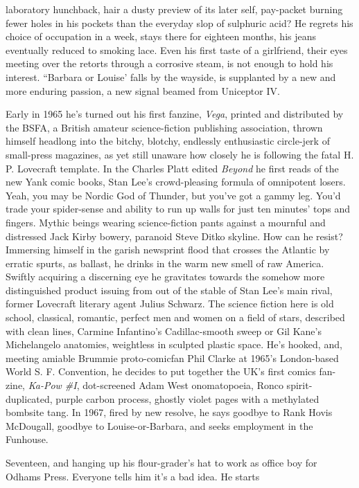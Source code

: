 \documentclass[
]{article}
\begin{document}
laboratory hunchback, hair a dusty preview of its later self, pay-packet
burning fewer holes in his pockets than the everyday slop of sulphuric
acid? He regrets his choice of occupation in a week, stays there for
eighteen months, his jeans eventually reduced to smoking lace. Even his
first taste of a girlfriend, their eyes meeting over the retorts through
a corrosive steam, is not enough to hold his interest. ``Barbara or
Louise' falls by the wayside, is supplanted by a new and more enduring
passion, a new signal beamed from Uniceptor IV. \par
Early in 1965 he's turned out his first fanzine, \emph{Vega},
printed and distributed by the BSFA, a British amateur science-fiction
publishing association, thrown himself headlong into the bitchy,
blotchy, endlessly enthusiastic circle-jerk of small-press magazines, as
yet still unaware how closely he is following the fatal H. P. Lovecraft
template. In the Charles Platt edited \emph{Beyond} he first reads of
the new Yank comic books, Stan Lee's crowd-pleasing formula of
omnipotent losers. Yeah, you may be Nordic God of Thunder, but you've
got a gammy leg. You'd trade your spider-sense and ability to run up
walls for just ten minutes' tops and fingers. Mythic beings wearing
science-fiction pants against a mournful and distressed Jack Kirby
bowery, paranoid Steve Ditko skyline. How can he resist? Immersing
himself in the garish newsprint flood that crosses the Atlantic by
erratic spurts, as ballast, he drinks in the warm new smell of raw
America. Swiftly acquiring a discerning eye he gravitates towards the
somehow more distinguished product issuing from out of the stable of
Stan Lee's main rival, former Lovecraft literary agent Julius Schwarz.
The science fiction here is old school, classical, romantic, perfect men
and women on a field of stars, described with clean lines, Carmine
Infantino's Cadillac-smooth sweep or Gil Kane's Michelangelo anatomies,
weightless in sculpted plastic space. He's hooked, and, meeting amiable
Brummie proto-comicfan Phil Clarke at 1965's London-based World S. F.
Convention, he decides to put together the UK's first comics fan-zine,
\emph{Ka-Pow \#I}, dot-screened Adam West onomatopoeia, Ronco
spirit-duplicated, purple carbon process, ghostly violet pages with a
methylated bombsite tang. In 1967, fired by new resolve, he says goodbye
to Rank Hovis McDougall, goodbye to Louise-or-Barbara, and seeks
employment in the Funhouse. \par
Seventeen, and hanging up his flour-grader's hat to work as office
boy for Odhams Press. Everyone tells him it's a bad idea. He starts
\end{document}

